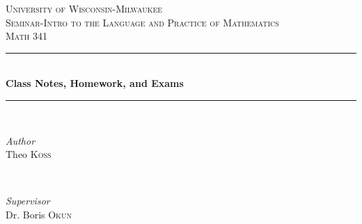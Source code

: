 \documentclass[hidelinks,12pt]{article}
\title{\scalebox{2.5}{Math 341 Notes}}
\author{\scalebox{1.5}{Theo Koss}}
\date{September 2017-January 2018}
\begin{document}
\begin{titlepage} %
	\newcommand{\HRule}{\rule{\linewidth}{0.5mm}} %
	
	\center %
	
	
	\textsc{\LARGE University of Wisconsin-Milwaukee}\\[1.5cm] %
	
	\textsc{\Large Seminar-Intro to the Language and Practice of Mathematics}\\[0.5cm] %
	
	\textsc{\large Math 341}\\[0.5cm] %
	
	
	\HRule\\[0.4cm]
	
	{\huge\bfseries Class Notes, Homework, and Exams}\\[0.4cm] %
	
	\HRule\\[1.5cm]
	
	
	\begin{minipage}{0.4\textwidth}
		\begin{flushleft}
			\large
			\textit{Author}\\
			Theo \textsc{Koss} %
		\end{flushleft}
	\end{minipage}
	~
	\begin{minipage}{0.4\textwidth}
		\begin{flushright}
			\large
			\textit{Supervisor}\\
			Dr. Boris \textsc{Okun} %
		\end{flushright}
	\end{minipage}
	
	

\end{titlepage}
\end{document}
